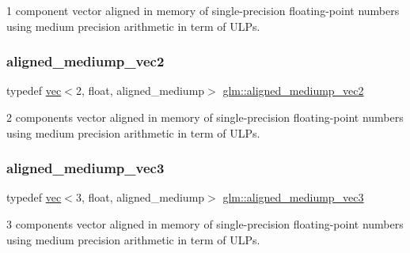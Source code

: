 1 component vector aligned in memory of single-\/precision floating-\/point numbers using medium precision arithmetic in term of U\+L\+Ps. 

\mbox{\label{group__gtc__type__aligned_ga96e85f0817c2c6734af6c981ce2b3940}} 
\subsubsection{\texorpdfstring{aligned\+\_\+mediump\+\_\+vec2}{aligned\_mediump\_vec2}}
{\footnotesize\ttfamily typedef \mbox{\hyperlink{structglm_1_1vec}{vec}}$<$2, float, aligned\+\_\+mediump$>$ \mbox{\hyperlink{group__gtc__type__aligned_ga96e85f0817c2c6734af6c981ce2b3940}{glm\+::aligned\+\_\+mediump\+\_\+vec2}}}



2 components vector aligned in memory of single-\/precision floating-\/point numbers using medium precision arithmetic in term of U\+L\+Ps. 

\mbox{\label{group__gtc__type__aligned_ga1c5c37a497fa004afa060bd173b20447}} 
\subsubsection{\texorpdfstring{aligned\+\_\+mediump\+\_\+vec3}{aligned\_mediump\_vec3}}
{\footnotesize\ttfamily typedef \mbox{\hyperlink{structglm_1_1vec}{vec}}$<$3, float, aligned\+\_\+mediump$>$ \mbox{\hyperlink{group__gtc__type__aligned_ga1c5c37a497fa004afa060bd173b20447}{glm\+::aligned\+\_\+mediump\+\_\+vec3}}}



3 components vector aligned in memory of single-\/precision floating-\/point numbers using medium precision arithmetic in term of U\+L\+Ps. 

